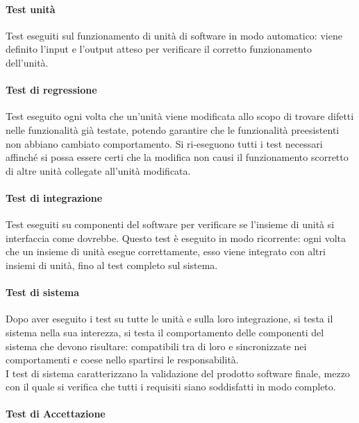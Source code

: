 				\paragraph{Test unità}
					Test eseguiti sul funzionamento di unità di software in modo automatico: viene definito l'input e l'output atteso per verificare il corretto funzionamento dell'unità.\\
				\paragraph{Test di regressione}
					Test eseguito ogni volta che un'unità viene modificata allo scopo di trovare difetti nelle funzionalità già testate, potendo garantire che le funzionalità preesistenti non abbiano cambiato comportamento. Si ri-eseguono tutti i test necessari affinché si possa essere certi che la modifica non causi il funzionamento scorretto di altre unità collegate all'unità modificata.\\
				\paragraph{Test di integrazione}
					Test eseguiti su componenti del software per verificare se l'insieme di unità si interfaccia come dovrebbe. Questo test è eseguito in modo ricorrente: ogni volta che un insieme di unità esegue correttamente, esso viene integrato con altri insiemi di unità, fino al test completo sul sistema.\\
				\paragraph{Test di sistema}
					Dopo aver eseguito i test su tutte le unità e sulla loro integrazione, si testa il sistema nella sua interezza, si testa il comportamento delle componenti del sistema che devono risultare: compatibili tra di loro e sincronizzate nei comportamenti e coese nello spartirsi le responsabilità.\\
					I test di sistema caratterizzano la validazione del prodotto software finale, mezzo con il quale si verifica che tutti i requisiti siano soddisfatti in modo completo.\\
				\paragraph{Test di Accettazione}
